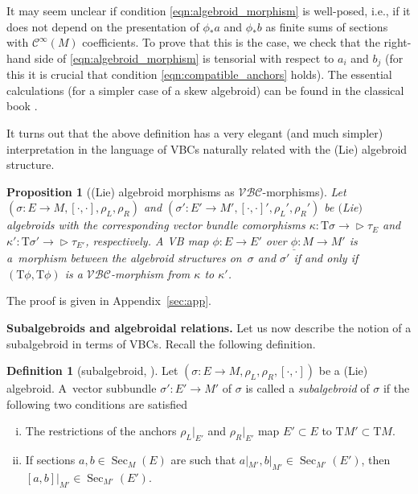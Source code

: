 \documentclass[pdftex]{sigma}
\newcommand{\ZM}{{VBC}} %
\newcommand{\Zakrzewski}{{vector bundle comorphism}}
\newcommand{\und}{\underline}
\newcommand{\Sec}{\operatorname{Sec}}
\newcommand{\ra}{\rightarrow}
\newcommand{\rhoL}{\rho_L} %
\newcommand{\rhoR}{\rho_R}
\newcommand{\T}{\mathrm{T}} %
\newcommand{\catZM}{{\mathcal{VBC}}} %
\newcommand{\Cf}{\mathcal{C}^\infty}
\def\relto{\rightarrow\!\!\vartriangleright} %
\numberwithin{equation}{section}
\newtheorem{prop}[thm]{Proposition}
\theoremstyle{definition}
\newtheorem{df}[thm]{Definition}
\begin{document}
It may seem unclear if condition \eqref{eqn:algebroid_morphism} is well-posed, i.e., if it does not depend on the presentation of $\phi_\ast a$ and $\phi_\ast b$ as finite sums of sections with $\Cf(M)$ coefficients. To prove that this is the case, we check that the right-hand side of \eqref{eqn:algebroid_morphism} is tensorial with respect to $a_i$ and $b_j$ (for this it is crucial that condition \eqref{eqn:compatible_anchors} holds). The essential calculations (for a simpler case of a skew algebroid) can be found in the classical book \cite{Mackenzie_lie_2005}.

It turns out that the above definition has a very elegant (and much simpler) interpretation in the language of \ZM s naturally related with the (Lie) algebroid structure.
\begin{prop}[(Lie) algebroid morphisms as $\catZM$-morphisms]\label{prop:alg_morphism}
Let $(\sigma\colon E\!\ra\! M,[\cdot,\cdot],\rhoL,\rhoR)$ and $(\sigma'\colon E' \ra M',[\cdot,\cdot]',\rhoL',\rhoR')$ be $($Lie$)$ algebroids with the corresponding \Zakrzewski s {$\kappa\colon \T\sigma\relto \tau_{E}$} and $\kappa'\colon \T\sigma'\relto \tau_{E'}$, respectively. A VB map $\phi\colon E\ra E'$ over $\und{\phi}\colon M\ra M'$ is a~morphism between the algebroid structures on~$\sigma$ and $\sigma'$ if and only if $(\T\phi,\T\phi)$ is a $\catZM$-morphism from $\kappa$ to $\kappa'$.
\end{prop}
The proof is given in Appendix~\ref{sec:app}.

{\bf Subalgebroids and algebroidal relations.} Let us now describe the notion of a subalgebroid in terms of \ZM s. Recall the following definition.

\begin{df}[subalgebroid, \cite{JG_mod_class_skew_alg_rel_2012, Mackenzie_lie_2005}]\label{def:sublagebroid}
Let $(\sigma\colon E\ra M, \rhoL,\rhoR, [\cdot, \cdot])$ be a (Lie) algebroid. A~vector subbundle $\sigma'\colon E'\ra M'$ of $\sigma$ is called a \emph{subalgebroid} of $\sigma$ if the following two conditions are satisfied
\begin{enumerate}[(i)]\itemsep=0pt
 \item \label{df:sub_algebroid_1} The restrictions of the anchors $\rhoL|_{E'}$ and $\rhoR|_{E'}$ map $E'\subset E$ to $\T M'\subset \T M$.
 \item \label{df:sub_algebroid_2} If sections $a,b\in\Sec_M(E)$ are such that $a|_{M'},b|_{M'} \in \Sec_{M'}(E')$, then $[a, b]|_{M'} \in \Sec_{M'}(E')$.
\end{enumerate}
\end{df}
\end{document}
